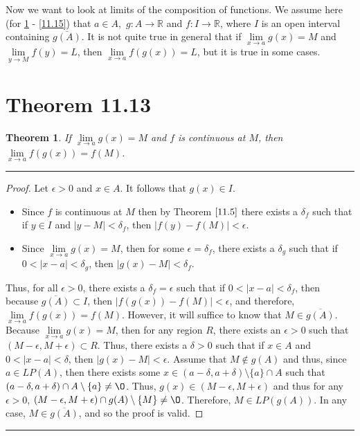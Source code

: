\documentclass[openany, amssymb, psamsfonts]{amsart}
\newcommand{\bbR}{\mathbb{R}}
\renewcommand{\emptyset}{\O}
\newcommand{\sm}{\setminus}
\newtheorem{thm}{Theorem}[section]
\theoremstyle{definition}
\numberwithin{equation}{section}
\begin{document}
Now we want to look at limits of the composition of functions. We assume here (for \ref{11.13} - \ref{11.15}) that  $a\in A,$ $g\colon A\to \bbR$ and $f\colon I\to \bbR$, where $I$ is an open interval containing $\overline{g(A)}.$  
It is not quite true in general that if
$\lim\limits_{x\to a} g(x) = M$ and $\lim\limits_{y\to M} f(y) = L$,
then $\lim\limits_{x\to a} f(g(x)) = L$, but it is true in some cases. 

\section*{Theorem 11.13}
\begin{thm} \label{11.13}
	If $\lim\limits_{x\to a} g(x) = M$ and $f$ is continuous at $M$, then
	$\lim\limits_{x\to a} f(g(x)) = f(M)$. 
\end{thm}
\vspace{4pt}     \hrule   \vspace{4pt}\begin{proof} 
Let $\epsilon>0$ and $x\in A$. It follows that $g(x) \in I$.
\begin{itemize}
    \item Since $f$ is continuous at $M$ then by Theorem $\ref{11.5}$ there exists a $\delta_f$ such that if $y\in I$ and $|y-M|<\delta_f$, then $|f(y) - f(M)|<\epsilon$.
    \item Since $\lim\limits_{x\to a}g(x) = M$, then for some $\epsilon = \delta_f$, there exists a $\delta_g$ such that if $0<|x-a|<\delta_g$, then $|g(x) - M|<\delta_f$.
\end{itemize}
Thus, for all $\epsilon>0$, there exists a $\delta_f = \epsilon$ such that if $0<|x-a|<\delta_f$, then because $\overline{g(A)}\subset I$, then $|f(g(x)) - f(M)|<\epsilon$, and therefore, $\lim\limits_{x\to a}f(g(x)) = f(M)$. However, it will suffice to know that $M \in \overline{g(A)}$. Because $\lim\limits_{x\to a}g(x) = M$, then for any region $R$, there exists an $\epsilon>0$ such that $(M-\epsilon, M+\epsilon) \subset R$. Thus, there exists a $\delta>0$ such that if $x\in A$ and $0<|x-a|< \delta$, then $|g(x) - M|<\epsilon$. Assume that $M\notin g(A)$ and thus, since $a\in LP(A)$, then there exists some $x\in (a-\delta, a+\delta)\sm\{a\}\cap A$ such that $(a-\delta, a+\delta)\cap A\sm\{a\}\neq \emptyset$. Thus, $g(x) \in (M-\epsilon, M+\epsilon)$ and thus for any $\epsilon>0$, $(M-\epsilon, M+\epsilon) \cap g(A)\sm\{M\}\neq \emptyset$. Therefore, $M\in LP(g(A))$. In any case, $M\in \overline{g(A)}$, and so the proof is valid.
\end{proof} \vspace{4pt}     \hrule   \vspace{4pt}
\end{document}
